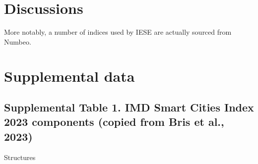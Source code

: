 \documentclass[
  english,
  12pt,
  a4paper,
]{scrartcl}
\begin{document}
\section{Discussions}\label{discussions}

More notably, a number of indices used by IESE are actually sourced from
Numbeo.

\appendix

\section{Supplemental data}\label{supplemental-data}

\subsection{Supplemental Table 1. IMD Smart Cities Index 2023 components
(copied from Bris et al.,
2023)}\label{supplemental-table-1.-imd-smart-cities-index-2023-components-copied-from-bris-et-al.-2023}

Structures
\end{document}
